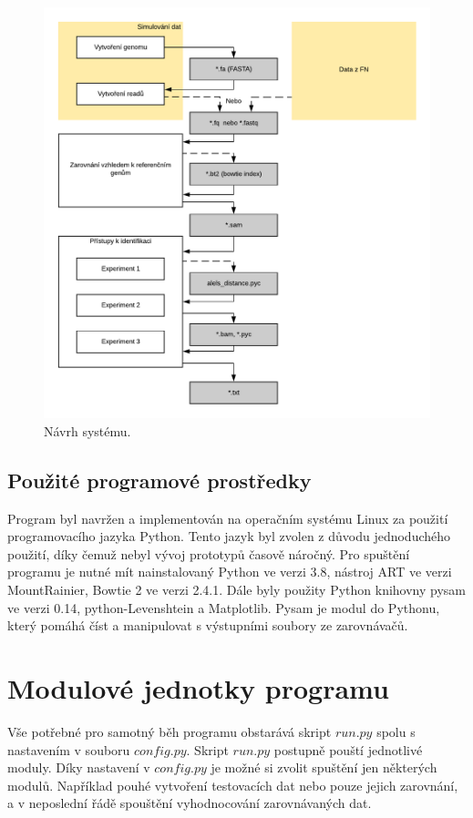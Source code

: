 \documentclass[czech,DP]{thesiskiv}
\numberwithin{equation}{section}
\begin{document}
\begin{figure}[H]
		\centering
		\includegraphics[width=\textwidth]{./img/navrh_systemu.pdf}
		\caption{Návrh systému. }
		\label{fig:navrh_systemu}
\end{figure}

\subsection{Použité programové prostředky}
Program byl navržen a implementován na operačním systému Linux za použití programovacího jazyka Python. Tento jazyk byl zvolen z důvodu jednoduchého použití, díky čemuž nebyl vývoj prototypů časově náročný. Pro spuštění programu je nutné mít nainstalovaný Python ve verzi 3.8, nástroj ART ve verzi MountRainier, Bowtie 2 ve verzi 2.4.1. Dále byly použity Python knihovny pysam ve verzi 0.14, python-Levenshtein a Matplotlib. Pysam je modul do Pythonu, který pomáhá číst a manipulovat s výstupními soubory ze zarovnávačů.

\section{Modulové jednotky programu}
Vše potřebné pro samotný běh programu obstarává skript $run.py$ spolu s nastavením v souboru $config.py$. Skript $run.py$ postupně pouští jednotlivé moduly. Díky nastavení v $config.py$ je možné si zvolit spuštění jen některých modulů. Například pouhé vytvoření testovacích dat nebo pouze jejich zarovnání, a v neposlední řádě spouštění vyhodnocování zarovnávaných dat.
\end{document}
